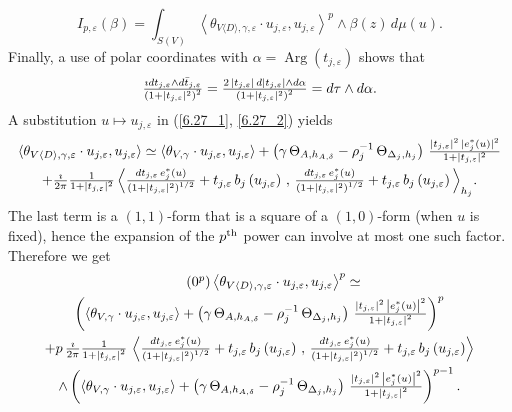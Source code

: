 \documentclass[AHL,Unicode,longabstracts,published]{cedram}
\DeclareMathOperator{\Arg}{Arg}
\DeclarePairedDelimiter{\abs}{\lvert}{\rvert}
\begin{document}
\begin{equation}\label{6.29}
I_{p,\varepsilon}(\beta)=\int_{S(V)}\left\langle\theta_{V\langle D\rangle,\gamma,\varepsilon}\cdot u_{j,\varepsilon},u_{j,\varepsilon}\right\rangle^p\wedge\beta(z)\,d\mu(u).
\end{equation}
Finally, a use of polar coordinates with
$\alpha=\Arg(t_{j,\varepsilon})$ shows that
\[
\tfrac{\imath dt_{j,\varepsilon}\wedge d\bar t_{j,\varepsilon}}{\left(1+\abs{t_{j,\varepsilon}}^2\right)^2}=
\tfrac{2\,\abs{t_{j,\varepsilon}}\,d\abs{t_{j,\varepsilon}}\wedge d\alpha}{\left(1+\abs{t_{j,\varepsilon}}^2\right)^2} = d\tau\wedge d\alpha.
\]
A substitution $u\mapsto u_{j,\varepsilon}$ in (\eqref{6.27_1}, \eqref{6.27_2}) yields
\begin{multline}\label{6.30}
\langle\theta_{V\langle D\rangle,\gamma,\varepsilon}\cdot u_{j,\varepsilon}, u_{j,\varepsilon}\rangle
\simeq\langle\theta_{V,\gamma}\cdot u_{j,\varepsilon},u_{j,\varepsilon}
\rangle+
\left(\gamma\,\Theta_{A,h_{A,\delta}}-\rho_j^{-1}\,\Theta_{\Delta_j,h_j}\right)
\,\tfrac{\abs{t_{j,\varepsilon}}^2\,\abs{e_j^*(u)}^2}{ 1+\abs{t_{j,\varepsilon}}^2}\\ +\tfrac{\imath}{ 2\pi}\tfrac{1}{ 1+\abs{t_{j,\varepsilon}}^2}\,\Big\langle
\tfrac{dt_{j,\varepsilon}\,e_j^*(u)}{\left(1+\abs{t_{j,\varepsilon}}^2\right)^{1/2}}+ t_{j,\varepsilon}\,b_j\left(u_{j,\varepsilon}\right)\,,\,
\tfrac{dt_{j,\varepsilon}\,e_j^*(u)}{\left(1+\abs{t_{j,\varepsilon}}^2\right)^{1/2}}+ t_{j,\varepsilon}\,b_j\left(u_{j,\varepsilon}\right)\Big\rangle_{h_j}.
\end{multline}
The last term is a $(1,1)$-form that is a square of a $(1,0)$-form (when $u$ is fixed), hence the expansion of the $p^{\rm th}$ power can involve at most one such factor. Therefore we get
\begin{multline}
\tag{$\theequation^{p}$}
\left\langle\theta_{V\langle D\rangle,\gamma,\varepsilon}\cdot u_{j,\varepsilon}, u_{j,\varepsilon}\right\rangle^p
\simeq\\
\left(
\left\langle\theta_{V,\gamma}\cdot u_{j,\varepsilon},u_{j,\varepsilon}\right\rangle +\left(\gamma\,\Theta_{A,h_{A,\delta}}-\rho_j^{-1}\,\Theta_{\Delta_j,h_j}\right)
\,\tfrac{\left|t_{j,\varepsilon}\right|^2\,\left|e_j^*(u)\right|^2}{1+\left|t_{j,\varepsilon}\right|^2}\right)^p\\ +p\,\tfrac{\imath}{ 2\pi}\tfrac{1}{1+\left|t_{j,\varepsilon}\right|^2}\,\left\langle
\tfrac{dt_{j,\varepsilon}\,e_j^*(u)}{\left(1+\abs{t_{j,\varepsilon}}^2\right)^{1/2}}+ t_{j,\varepsilon}\,b_j\left(u_{j,\varepsilon}\right)\,,\,
\tfrac{dt_{j,\varepsilon}\,e_j^*(u)}{\left(1+\abs{t_{j,\varepsilon}}^2\right)^{1/2}}+ t_{j,\varepsilon}\,b_j\left(u_{j,\varepsilon}\right)\right\rangle\\
\wedge{}\left(
\left\langle\theta_{V,\gamma}\cdot u_{j,\varepsilon},u_{j,\varepsilon}\right\rangle +\left(\gamma\,\Theta_{A,h_{A,\delta}}-\rho_j^{-1}\,\Theta_{\Delta_j,h_j}\right)
\,\tfrac{\left|t_{j,\varepsilon}\right|^2\,\left|e_j^*(u)\right|^2}{ 1+\left|t_{j,\varepsilon}\right|^2}
\right)^{p-1}.
\end{multline}
\end{document}
